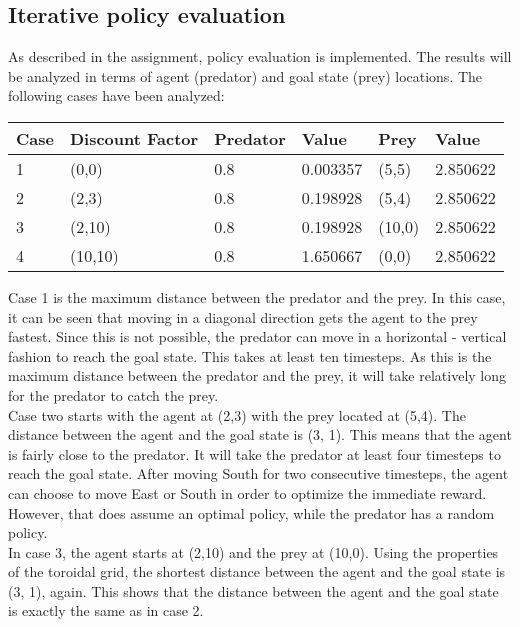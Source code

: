 \documentclass{article}
\begin{document}
\subsection*{Iterative policy evaluation}
As described in the assignment, policy evaluation is implemented. The results will be analyzed in terms of agent (predator) and goal state (prey) locations. The following cases have been analyzed: %
\begin{center}
	\begin{tabular}{ | l | l | l | l | l | l |}
	\hline
	Case & Discount Factor & Predator & Value & Prey & Value\\
	\hline
	1 & (0,0) & 0.8 & 0.003357 & (5,5) & 2.850622 \\ 
	\hline
	2 & (2,3) & 0.8 & 0.198928 & (5,4) & 2.850622 \\ 
	\hline
	3 & (2,10) & 0.8 & 0.198928 & (10,0) & 2.850622 \\ 
	\hline
	4 & (10,10) & 0.8 & 1.650667 & (0,0) & 2.850622 \\ 
	\hline
	\end{tabular}
\end{center}

Case 1 is the maximum distance between the predator and the prey. In this case, it can be seen that moving in a diagonal direction gets the agent to the prey fastest. Since this is not possible, the predator can move in a horizontal - vertical fashion to reach the goal state. This takes at least ten timesteps. As this is the maximum distance between the predator and the prey, it will take relatively long for the predator to catch the prey. \\

Case two starts with the agent at (2,3) with the prey located at (5,4). The distance between the agent and the goal state is (3, 1). This means that the agent is fairly close to the predator. It will take the predator at least four timesteps to reach the goal state. After moving South for two consecutive timesteps, the agent can choose to move East or South in order to optimize the immediate reward. However, that does assume an optimal policy, while the predator has a random policy. \\

In case 3, the agent starts at (2,10) and the prey at (10,0). Using the properties of the toroidal grid, the shortest distance between the agent and the goal state is (3, 1), again. This shows that the distance between the agent and the goal state is exactly the same as in case 2. \\ 
\end{document}

